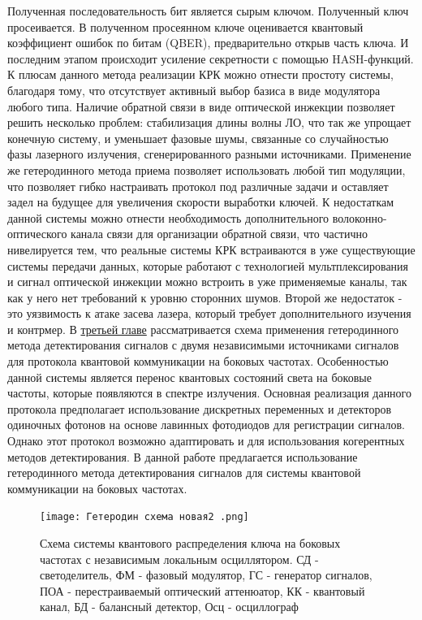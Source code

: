 Полученная последовательность бит является сырым ключом. Полученный ключ просеивается. В полученном просеянном ключе оценивается квантовый коэффициент ошибок по битам (QBER), предварительно открыв часть ключа. И последним этапом происходит усиление секретности  с помощью HASH-функций.
\newline К плюсам данного метода реализации КРК можно отнести простоту системы, благодаря тому, что отсутствует активный выбор базиса в виде модулятора любого типа. Наличие обратной связи в виде оптической инжекции позволяет решить несколько проблем: стабилизация длины волны ЛО, что так же упрощает конечную систему, и уменьшает фазовые шумы, связанные со случайностью фазы лазерного излучения, сгенерированного разными источниками. Применение же гетеродинного метода приема позволяет использовать любой тип модуляции, что позволяет гибко настраивать протокол под различные задачи и оставляет задел на будущее для увеличения скорости выработки ключей.
\newline К недостаткам данной системы можно отнести необходимость дополнительного волоконно-оптического канала связи для организации обратной связи, что частично нивелируется тем, что реальные системы КРК встраиваются в уже существующие системы передачи данных, которые работают с технологией мультплексирования и сигнал оптической инжекции можно встроить в уже применяемые каналы, так как у него нет требований к уровню сторонних шумов. Второй же недостаток - это уязвимость к атаке засева лазера, который требует дополнительного изучения и контрмер. 
\newpage В \underline{третьей главе} рассматривается схема применения гетеродинного метода детектирования сигналов с двумя независимыми источниками сигналов для протокола квантовой коммуникации на боковых частотах. Особенностью данной системы является перенос квантовых состояний света на боковые частоты, которые появляются в спектре излучения. Основная реализация данного протокола предполагает использование дискретных переменных и детекторов одиночных фотонов на основе лавинных фотодиодов для регистрации сигналов. Однако этот протокол возможно адаптировать и для использования когерентных методов детектирования. 
\newline В данной работе предлагается использование гетеродинного метода детектирования сигналов для системы квантовой коммуникации на боковых частотах.
\begin{figure}
    \centering
    \texttt{[image: Гетеродин схема новая2 .png]}
    \caption{Схема системы квантового распределения ключа на боковых частотах с независимым локальным осциллятором. СД - светоделитель, ФМ - фазовый модулятор, ГС - генератор сигналов, ПОА - перестраиваемый оптический аттенюатор, КК - квантовый канал, БД - балансный детектор, Осц - осциллограф}
    \label{fig:het true scheme}
\end{figure}
